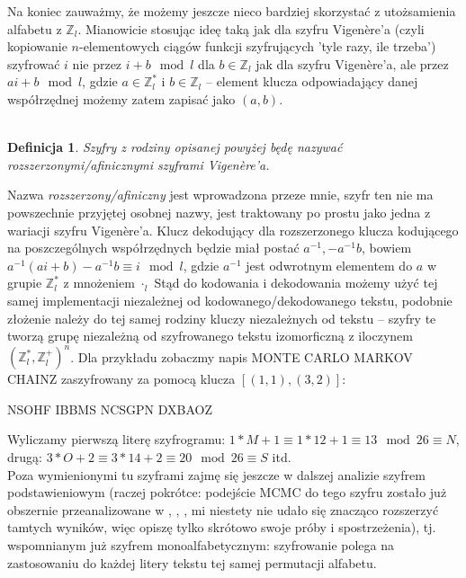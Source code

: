 \documentclass[a4paper]{article}
\theoremstyle{defn}
\newtheorem{defn}{Definicja}[subsection]
\theoremstyle{theorem}
\theoremstyle{lemma}
\theoremstyle{cor}
\theoremstyle{fact}
\begin{document}
Na koniec zauważmy, że możemy jeszcze nieco bardziej skorzystać z utożsamienia alfabetu z $\mathbb{Z}_l$. Mianowicie stosując ideę taką jak dla szyfru Vigenère'a (czyli kopiowanie $n$-elementowych ciągów funkcji szyfrujących 'tyle razy, ile trzeba') szyfrować $i$ nie przez $i+b \mod l$ dla $b \in \mathbb{Z}_l$ jak dla szyfru Vigenère'a, ale przez $ai+b \mod l$, gdzie $a \in \mathbb{Z}_l^*$ i $b \in \mathbb{Z}_l$ – element klucza odpowiadający danej współrzędnej możemy zatem zapisać jako $(a,b)$. \\\\
\begin{defn}\label{defn4.2.3}
Szyfry z rodziny opisanej powyżej będę nazywać \textit{rozszerzonymi/afinicznymi szyframi Vigenère'a}.
\end{defn}
Nazwa \textit{rozszerzony/afiniczny} jest wprowadzona przeze mnie, szyfr ten nie ma powszechnie przyjętej osobnej nazwy, jest traktowany po prostu jako jedna z wariacji szyfru Vigenère'a. Klucz dekodujący dla rozszerzonego klucza kodującego na poszczególnych współrzędnych będzie miał postać $a^{-1}, -a^{-1}b$, bowiem $a^{-1}(ai+b) - a^{-1}b \equiv i \mod l$, gdzie $a^{-1}$ jest odwrotnym elementem do $a$ w grupie $\mathbb{Z}_l^*$ z mnożeniem $\cdot_l$ Stąd do kodowania i dekodowania możemy użyć tej samej implementacji niezależnej od kodowanego/dekodowanego tekstu, podobnie złożenie należy do tej samej rodziny kluczy niezależnych od tekstu – szyfry te tworzą grupę niezależną od szyfrowanego tekstu izomorficzną z iloczynem $(\mathbb{Z}_l^*, \mathbb{Z}_l^+)^n$.
Dla przykładu zobaczmy napis MONTE CARLO MARKOV CHAINZ zaszyfrowany za pomocą klucza $[(1,1), (3,2)]$:
\begin{center}
    NSOHF IBBMS NCSGPN DXBAOZ
\end{center}
Wyliczamy pierwszą literę szyfrogramu: $1*M+1 \equiv 1*12+1 \equiv 13 \mod 26 \equiv N$, drugą: $3*O + 2 \equiv 3*14 + 2 \equiv 20 \mod 26 \equiv S$ itd.
\\

Poza wymienionymi tu szyframi zajmę się jeszcze w dalszej analizie szyfrem podstawieniowym (raczej pokrótce: podejście MCMC do tego szyfru zostało już obszernie przeanalizowane w \cite{Diaconis}, \cite{Connor}, \cite{Chen&Rosenthal}, mi niestety nie udało się znacząco rozszerzyć tamtych wyników, więc opiszę tylko skrótowo swoje próby i spostrzeżenia), tj. wspomnianym już szyfrem monoalfabetycznym: szyfrowanie polega na zastosowaniu do każdej litery tekstu tej samej permutacji alfabetu.
\end{document}
